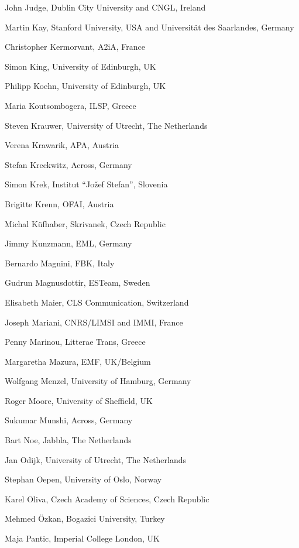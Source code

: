 \documentclass[10pt, plain]{../../metanetpaper}
\begin{document}
\begin{multicols}{3}
\begin{small}
\begin{enumerate}
{      \item John Judge, Dublin City University and CNGL, Ireland
      \item Martin Kay, Stanford University, USA and Universität des Saarlandes, Germany
      \item Christopher Kermorvant, A2iA, France
      \item Simon King, University of Edinburgh, UK
      \item Philipp Koehn, University of Edinburgh, UK
      \item Maria Koutsombogera, ILSP, Greece
      \item Steven Krauwer, University of Utrecht, The Netherlands
      \item Verena Krawarik, APA, Austria
      \item Stefan Kreckwitz, Across, Germany
      \item Simon Krek, Institut ``Jožef Stefan'', Slovenia
      \item Brigitte Krenn, OFAI, Austria
      \item Michal Küfhaber, Skrivanek, Czech Republic
      \item Jimmy Kunzmann, EML, Germany
      \item Bernardo Magnini, FBK, Italy
      \item Gudrun Magnusdottir, ESTeam, Sweden
      \item Elisabeth Maier, CLS Communication, Switzerland
      \item Joseph Mariani, CNRS/LIMSI and IMMI, France
      \item Penny Marinou, Litterae Trans, Greece
      \item Margaretha Mazura, EMF, UK/Belgium
      \item Wolfgang Menzel, University of Hamburg, Germany
      \item Roger Moore, University of Sheffield, UK
      \item Sukumar Munshi, Across, Germany
      \item Bart Noe, Jabbla, The Netherlands
      \item Jan Odijk, University of Utrecht, The Netherlands
      \item Stephan Oepen, University of Oslo, Norway
      \item Karel Oliva, Czech Academy of Sciences, Czech Republic
      \item Mehmed Özkan, Bogazici University, Turkey
      \item Maja Pantic, Imperial College London, UK
}
\end{enumerate}
\end{small}
\end{multicols}
\end{document}

